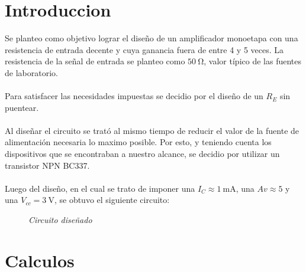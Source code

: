 \documentclass[a4paper,12pt]{article}
\newcommand{\mI}[1]{\SI{#1}{\milli\ampere}}
\newcommand{\mV}[1]{\SI{#1}{\volt}}
\begin{document}


\section{Introduccion}
    Se planteo como objetivo lograr el diseño de un amplificador monoetapa con una resistencia de entrada decente
    y cuya ganancia fuera de entre 4 y 5 veces. 
    La resistencia de la señal de entrada se planteo como $\SI{50}{\ohm}$, valor típico de las fuentes de laboratorio.
    \\ \\
    Para satisfacer las necesidades impuestas se decidio por el diseño de un $R_E$ sin puentear. 
    \\ \\
    Al diseñar el circuito se trató al mismo tiempo de reducir el valor de la fuente de alimentación necesaria lo maximo
    posible. Por esto, y teniendo cuenta los dispositivos que se encontraban a nuestro alcance, se decidio por utilizar
    un transistor NPN BC337. 
    \\ \\
    Luego del diseño, en el cual se trato de imponer una $I_C \approx \mI{1}$, una $Av \approx 5$ y una $V_{cc} = \mV{3}$, 
    se obtuvo el siguiente circuito: 
    \begin{figure}[H]
        \setlength{\abovecaptionskip}{0pt}
		\centering
		\captionsetup{labelformat=empty}
		\caption{\small{\textit{ Circuito diseñado }}}
    \end{figure}

\newpage
\section{Calculos}
\end{document}
